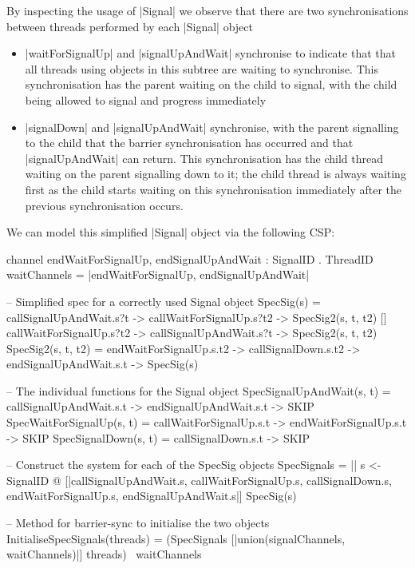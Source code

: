 By inspecting the usage of |Signal| we observe that there are two synchronisations between threads performed by each |Signal| object 
\inlineScala
\begin{itemize}
  \item |waitForSignalUp| and |signalUpAndWait| synchronise to indicate that that all threads using objects in this subtree are waiting to synchronise. This synchronisation has the parent waiting on the child to signal, with the child being allowed to signal and progress immediately
  \item |signalDown| and |signalUpAndWait| synchronise, with the parent signalling to the child that the barrier synchronisation has occurred and that |signalUpAndWait| can return. This synchronisation has the child thread waiting on the parent signalling down to it; the child thread is always waiting first as the child starts waiting on this synchronisation immediately after the previous synchronisation occurs.
\end{itemize}
\inlineCSP
We can model this simplified |Signal| object via the following CSP:

  \begin{cspm}[caption={The CSP model of the specification {\scalastyle Signal} object}]
channel endWaitForSignalUp, endSignalUpAndWait : SignalID . ThreadID
waitChannels = {|endWaitForSignalUp, endSignalUpAndWait|}

-- Simplified spec for a correctly used Signal object
SpecSig(s) = 
    callSignalUpAndWait.s?t -> callWaitForSignalUp.s?t2 -> SpecSig2(s, t, t2)
  [] callWaitForSignalUp.s?t2 -> callSignalUpAndWait.s?t -> SpecSig2(s, t, t2)
SpecSig2(s, t, t2) = 
  endWaitForSignalUp.s.t2 -> callSignalDown.s.t2 -> endSignalUpAndWait.s.t -> SpecSig(s)

-- The individual functions for the Signal object
SpecSignalUpAndWait(s, t) = callSignalUpAndWait.s.t -> endSignalUpAndWait.s.t -> SKIP
SpecWaitForSignalUp(s, t) = callWaitForSignalUp.s.t -> endWaitForSignalUp.s.t -> SKIP
SpecSignalDown(s, t) = callSignalDown.s.t -> SKIP

-- Construct the system for each of the SpecSig objects
SpecSignals = 
  || s <- SignalID @ [{|callSignalUpAndWait.s, callWaitForSignalUp.s, 
                        callSignalDown.s, endWaitForSignalUp.s, endSignalUpAndWait.s|}] 
                      SpecSig(s)

-- Method for barrier-sync to initialise the two objects
InitialiseSpecSignals(threads) = 
  (SpecSignals [|union(signalChannels, waitChannels)|] threads) \ waitChannels                     
  \end{cspm} 

